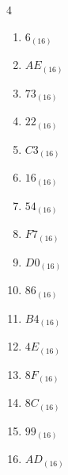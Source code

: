 \begin{multicols}{4}
\begin{enumerate}
  \item $6_{(16)}$

        \phantom{$=6$}

  \item $AE_{(16)}$

        \phantom{$=174$}

  \item $73_{(16)}$

        \phantom{$=115$}

\columnbreak %

  \item $22_{(16)}$

        \phantom{$=34$}

  \item $C3_{(16)}$

        \phantom{$=195$}

  \item $16_{(16)}$

        \phantom{$=22$}

  \item $54_{(16)}$

        \phantom{$=84$}

  \item $F7_{(16)}$

        \phantom{$=247$}

  \item $D0_{(16)}$

        \phantom{$=208$}

  \item $86_{(16)}$

        \phantom{$=134$}

  \item $B4_{(16)}$

        \phantom{$=180$}

  \item $4E_{(16)}$

        \phantom{$=78$}

  \item $8F_{(16)}$

        \phantom{$=143$}

  \item $8C_{(16)}$

        \phantom{$=140$}

  \item $99_{(16)}$

        \phantom{$=153$}

  \item $AD_{(16)}$


\end{enumerate}
\end{multicols}
